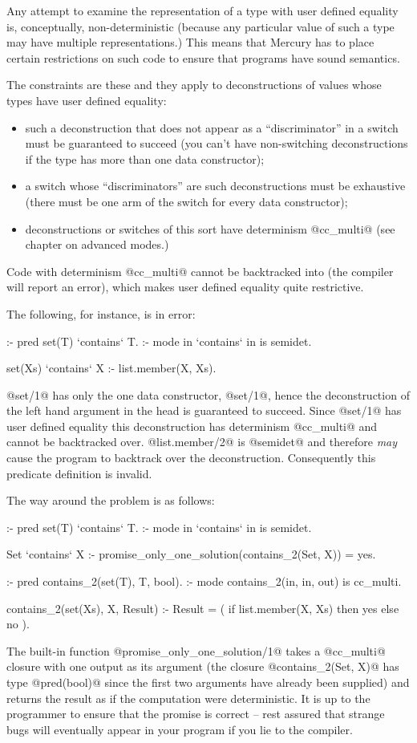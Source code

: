 Any attempt to examine the representation of a type with user defined
equality is, conceptually, non-deterministic (because any particular value
of such a type may have multiple representations.)  This means that Mercury
has to place certain restrictions on such code to ensure that programs have
sound semantics.

The constraints are these and they apply to deconstructions of values whose
types have user defined equality:
\begin{itemize}
\item such a deconstruction that does not appear as a ``discriminator'' in a
switch must be guaranteed to succeed (\ie you can't have non-switching
deconstructions if the type has more than one data constructor);
\item a switch whose ``discriminators'' are such deconstructions must be
exhaustive (\ie there must be one arm of the switch for every data
constructor);
\item deconstructions or switches of this sort have determinism @cc_multi@
(see chapter \XXX{} on advanced modes.)
\end{itemize}
Code with determinism @cc_multi@ cannot be backtracked into (the compiler
will report an error), which makes user defined equality quite restrictive.

The following, for instance, is in error:
\begin{myverbatim}
:- pred set(T) `contains` T.
:- mode in     `contains` in is semidet.

set(Xs) `contains` X :- list.member(X, Xs).
\end{myverbatim}
@set/1@ has only the one data constructor, @set/1@, hence the deconstruction
of the left hand argument in the head is guaranteed to succeed.
Since @set/1@ has user defined equality this deconstruction has determinism
@cc_multi@ and cannot be backtracked over.
@list.member/2@ is @semidet@ and therefore \emph{may} cause the program to
backtrack over the deconstruction.  Consequently this predicate definition
is invalid.

The way around the problem is as follows:
\begin{myverbatim}
:- pred set(T) `contains` T.
:- mode in     `contains` in is semidet.

Set `contains` X :-
    promise_only_one_solution(contains_2(Set, X)) = yes.

:- pred contains_2(set(T), T,  bool).
:- mode contains_2(in,     in, out) is cc_multi.

contains_2(set(Xs), X, Result) :-
    Result = ( if list.member(X, Xs) then yes else no ).
\end{myverbatim}
The built-in function @promise_only_one_solution/1@ takes a @cc_multi@
closure with one output as its argument (the closure
@contains_2(Set, X)@ has type @pred(bool)@ since the first two arguments
have already been supplied) and returns the result as if the computation
were deterministic.  It is up to the programmer to ensure that the promise
is correct -- rest assured that strange bugs will eventually appear in your
program if you lie to the compiler.


